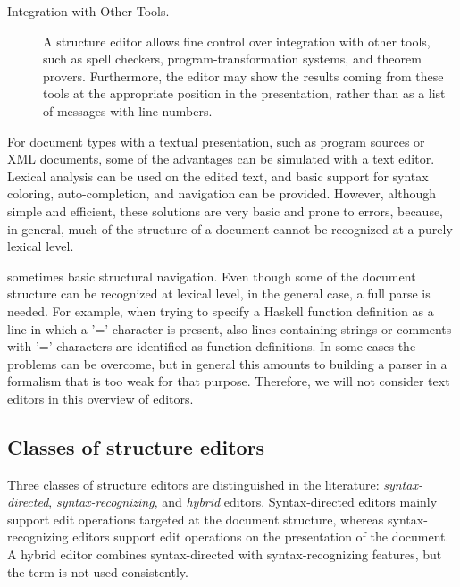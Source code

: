 \documentclass{speauth}
\begin{document}
\begin{description}
\item[Integration with Other Tools.] A structure editor allows fine control over integration with other tools, such as spell checkers, program-transformation systems, and theorem provers. Furthermore, the editor may show the results coming from these tools at the appropriate position in the presentation, rather than as a list of messages with line numbers.

\end{description}

For document types with a textual presentation, such as program sources or XML documents, some of the advantages can be simulated with a text editor. Lexical analysis can be used on the edited text, and basic support for syntax coloring, auto-completion, and navigation can be provided. However, although simple and efficient, these solutions are  very basic and prone to errors, because, in general, much of the structure of a document cannot be recognized at a purely lexical level.

\bc

sometimes basic structural navigation.  Even though some of the document structure can be recognized at lexical level, in the general case, a full parse is needed. For example, when trying to specify a Haskell function definition as a line in which a '=' character is present, also lines containing strings or comments with '=' characters are identified as function definitions. In some cases the problems can be overcome, but in general this amounts to building a parser in a formalism that is too weak for that purpose. Therefore, we will not consider text editors in this overview of editors.

\ec

\subsection{Classes of structure editors} 
\label{sect:classes}
Three classes of structure editors are distinguished in the literature: {\em syntax-directed}, {\em syntax-recognizing}, and {\em hybrid} editors. Syntax-directed editors mainly support edit operations targeted at the document structure, whereas syntax-recognizing editors support edit operations on the presentation of the document. A hybrid editor combines syntax-directed with syntax-recognizing features, but the term is not used consistently. 

\end{document}
